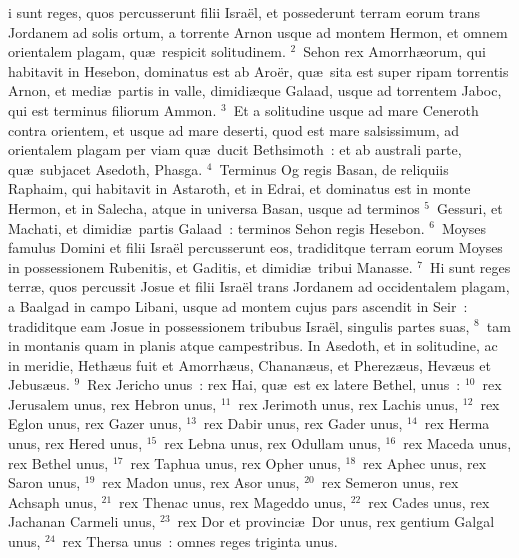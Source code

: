 \bchapter
{}i sunt reges, quos percusserunt filii Isra\"el, et possederunt terram eorum trans Jordanem ad solis ortum, a torrente Arnon usque ad montem Hermon, et omnem orientalem plagam, qu\ae\ respicit solitudinem.
${}^{2}$~Sehon rex Amorrh\ae orum, qui habitavit in Hesebon, dominatus est ab Aro\"er, qu\ae\ sita est super ripam torrentis Arnon, et medi\ae\ partis in valle, dimidi\ae que Galaad, usque ad torrentem Jaboc, qui est terminus filiorum Ammon.
${}^{3}$~Et a solitudine usque ad mare Ceneroth contra orientem, et usque ad mare deserti, quod est mare salsissimum, ad orientalem plagam per viam qu\ae\ ducit Bethsimoth~: et ab australi parte, qu\ae\ subjacet Asedoth, Phasga.
${}^{4}$~Terminus Og regis Basan, de reliquiis Raphaim, qui habitavit in Astaroth, et in Edrai, et dominatus est in monte Hermon, et in Salecha, atque in universa Basan, usque ad terminos
${}^{5}$~Gessuri, et Machati, et dimidi\ae\ partis Galaad~: terminos Sehon regis Hesebon.
${}^{6}$~Moyses famulus Domini et filii Isra\"el percusserunt eos, tradiditque terram eorum Moyses in possessionem Rubenitis, et Gaditis, et dimidi\ae\ tribui Manasse.
${}^{7}$~Hi sunt reges terr\ae , quos percussit Josue et filii Isra\"el trans Jordanem ad occidentalem plagam, a Baalgad in campo Libani, usque ad montem cujus pars ascendit in Seir~: tradiditque eam Josue in possessionem tribubus Isra\"el, singulis partes suas,
${}^{8}$~tam in montanis quam in planis atque campestribus. In Asedoth, et in solitudine, ac in meridie, Heth\ae us fuit et Amorrh\ae us, Chanan\ae us, et Pherez\ae us, Hev\ae us et Jebus\ae us.
${}^{9}$~Rex Jericho unus~: rex Hai, qu\ae\ est ex latere Bethel, unus~:
${}^{10}$~rex Jerusalem unus, rex Hebron unus,
${}^{11}$~rex Jerimoth unus, rex Lachis unus,
${}^{12}$~rex Eglon unus, rex Gazer unus,
${}^{13}$~rex Dabir unus, rex Gader unus,
${}^{14}$~rex Herma unus, rex Hered unus,
${}^{15}$~rex Lebna unus, rex Odullam unus,
${}^{16}$~rex Maceda unus, rex Bethel unus,
${}^{17}$~rex Taphua unus, rex Opher unus,
${}^{18}$~rex Aphec unus, rex Saron unus,
${}^{19}$~rex Madon unus, rex Asor unus,
${}^{20}$~rex Semeron unus, rex Achsaph unus,
${}^{21}$~rex Thenac unus, rex Mageddo unus,
${}^{22}$~rex Cades unus, rex Jachanan Carmeli unus,
${}^{23}$~rex Dor et provinci\ae\ Dor unus, rex gentium Galgal unus,
${}^{24}$~rex Thersa unus~: omnes reges triginta unus.

